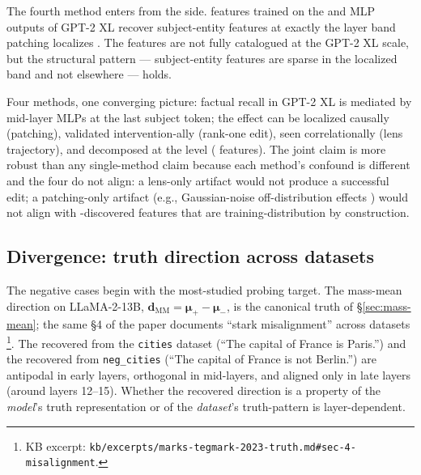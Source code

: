The fourth method enters from the  side.  features trained on
the  and MLP outputs of GPT-2 XL recover
subject-entity features at exactly the layer band patching
localizes . The features are not fully
catalogued at the GPT-2 XL scale, but the structural pattern ---
subject-entity features are sparse in the localized band and not
elsewhere --- holds.

Four methods, one converging picture: factual recall in GPT-2 XL is
mediated by mid-layer MLPs at the last subject token; the effect
can be localized causally (patching), validated intervention-ally
(rank-one edit), seen correlationally (lens trajectory), and
decomposed at the  level ( features). The joint claim is
more robust than any single-method claim because each method's
confound is different and the four do not align: a lens-only
artifact would not produce a successful edit; a patching-only
artifact (e.g., Gaussian-noise off-distribution effects
\citep{zhang2023-apatching}) would not align with -discovered
features that are training-distribution by construction.

\subsection{Divergence: truth direction across datasets}
\label{sec:cross-truth}

The negative cases begin with the most-studied probing target. The
\citet{marks-tegmark-2023-truth} mass-mean direction on
LLaMA-2-13B, $\mathbf{d}_{\mathrm{MM}} = \boldsymbol{\mu}_+ -
\boldsymbol{\mu}_-$, is the canonical truth  of
\S\ref{sec:mass-mean}; the same \S 4 of the paper documents
``stark misalignment'' across datasets \citep[\S 4]{marks-tegmark-2023-truth}\footnote{KB
excerpt: \texttt{kb/excerpts/marks-tegmark-2023-truth.md\#sec-4-misalignment}.}.
The  recovered from the \texttt{cities} dataset
(``The capital of France is Paris.'') and the 
recovered from \texttt{neg\_cities} (``The capital of France is
not Berlin.'') are antipodal in early layers, orthogonal in
mid-layers, and aligned only in late layers (around layers
12--15). Whether the recovered direction is a property of the
\emph{model}'s truth representation or of the \emph{dataset}'s
truth-pattern is layer-dependent.

